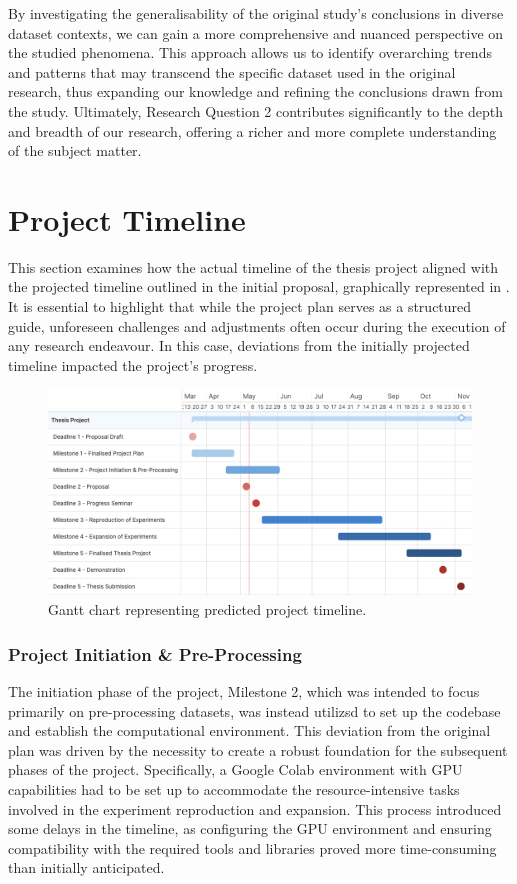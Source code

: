 By investigating the generalisability of the original study's conclusions in diverse dataset contexts, we can gain a more comprehensive and nuanced perspective on the studied phenomena. This approach allows us to identify overarching trends and patterns that may transcend the specific dataset used in the original research, thus expanding our knowledge and refining the conclusions drawn from the study. Ultimately, Research Question 2 contributes significantly to the depth and breadth of our research, offering a richer and more complete understanding of the subject matter.

\section{Project Timeline}
This section examines how the actual timeline of the thesis project aligned with the projected timeline outlined in the initial proposal, graphically represented in . It is essential to highlight that while the project plan serves as a structured guide, unforeseen challenges and adjustments often occur during the execution of any research endeavour. In this case, deviations from the initially projected timeline impacted the project's progress.

\begin{figure}[h]
    \centering
    \includegraphics[width=\textwidth]{1Introduction/GanttChart.png}
    \caption{Gantt chart representing predicted project timeline.}
    \label{fig:gantt}
\end{figure}

\subsubsection{Project Initiation \& Pre-Processing}
The initiation phase of the project, Milestone 2, which was intended to focus primarily on pre-processing datasets, was instead utilizsd to set up the codebase and establish the computational environment. This deviation from the original plan was driven by the necessity to create a robust foundation for the subsequent phases of the project. Specifically, a Google Colab environment with GPU capabilities had to be set up to accommodate the resource-intensive tasks involved in the experiment reproduction and expansion. This process introduced some delays in the timeline, as configuring the GPU environment and ensuring compatibility with the required tools and libraries proved more time-consuming than initially anticipated.

